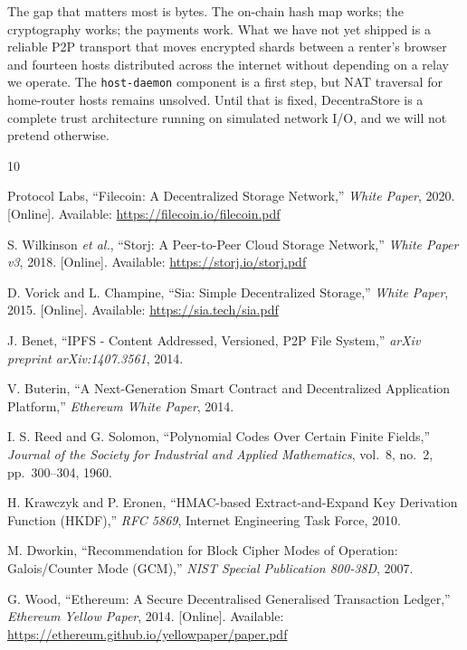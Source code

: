 \documentclass[journal]{IEEEtran}
\begin{document}
The gap that matters most is bytes. The on-chain hash map works;
the cryptography works; the payments work. What we have not yet shipped
is a reliable P2P transport that moves encrypted shards between a renter's
browser and fourteen hosts distributed across the internet without depending
on a relay we operate. The \texttt{host-daemon} component is a first step,
but NAT traversal for home-router hosts remains unsolved. Until that is
fixed, DecentraStore is a complete trust architecture running on simulated
network I/O, and we will not pretend otherwise.

\begin{thebibliography}{10}

Protocol Labs, ``Filecoin: A Decentralized Storage Network,''
\textit{White Paper}, 2020. [Online]. Available: \url{https://filecoin.io/filecoin.pdf}

S. Wilkinson \textit{et al.}, ``Storj: A Peer-to-Peer Cloud Storage Network,''
\textit{White Paper v3}, 2018. [Online]. Available: \url{https://storj.io/storj.pdf}

D. Vorick and L. Champine, ``Sia: Simple Decentralized Storage,''
\textit{White Paper}, 2015. [Online]. Available: \url{https://sia.tech/sia.pdf}

J. Benet, ``IPFS - Content Addressed, Versioned, P2P File System,''
\textit{arXiv preprint arXiv:1407.3561}, 2014.

V. Buterin, ``A Next-Generation Smart Contract and Decentralized Application Platform,''
\textit{Ethereum White Paper}, 2014.

I. S. Reed and G. Solomon, ``Polynomial Codes Over Certain Finite Fields,''
\textit{Journal of the Society for Industrial and Applied Mathematics},
vol.~8, no.~2, pp.~300--304, 1960.

H. Krawczyk and P. Eronen, ``HMAC-based Extract-and-Expand Key Derivation Function (HKDF),''
\textit{RFC 5869}, Internet Engineering Task Force, 2010.

M. Dworkin, ``Recommendation for Block Cipher Modes of Operation: Galois/Counter Mode (GCM),''
\textit{NIST Special Publication 800-38D}, 2007.

G. Wood, ``Ethereum: A Secure Decentralised Generalised Transaction Ledger,''
\textit{Ethereum Yellow Paper}, 2014. [Online]. Available:
\url{https://ethereum.github.io/yellowpaper/paper.pdf}


\end{thebibliography}
\end{document}

